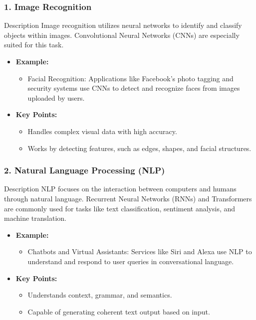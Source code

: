 \documentclass[aspectratio=169]{beamer}
\begin{document}
\begin{frame}[fragile]
    \frametitle{1. Image Recognition}
    \begin{block}{Description}
        Image recognition utilizes neural networks to identify and classify objects within images. Convolutional Neural Networks (CNNs) are especially suited for this task.
    \end{block}
    
    \begin{itemize}
        \item \textbf{Example:}
        \begin{itemize}
            \item Facial Recognition: Applications like Facebook's photo tagging and security systems use CNNs to detect and recognize faces from images uploaded by users.
        \end{itemize}
        \item \textbf{Key Points:}
        \begin{itemize}
            \item Handles complex visual data with high accuracy.
            \item Works by detecting features, such as edges, shapes, and facial structures.
        \end{itemize}
    \end{itemize}
\end{frame}

\begin{frame}[fragile]
    \frametitle{2. Natural Language Processing (NLP)}
    \begin{block}{Description}
        NLP focuses on the interaction between computers and humans through natural language. Recurrent Neural Networks (RNNs) and Transformers are commonly used for tasks like text classification, sentiment analysis, and machine translation.
    \end{block}

    \begin{itemize}
        \item \textbf{Example:}
        \begin{itemize}
            \item Chatbots and Virtual Assistants: Services like Siri and Alexa use NLP to understand and respond to user queries in conversational language.
        \end{itemize}
        \item \textbf{Key Points:}
        \begin{itemize}
            \item Understands context, grammar, and semantics.
            \item Capable of generating coherent text output based on input.
        \end{itemize}
    \end{itemize}
\end{frame}
\end{document}
